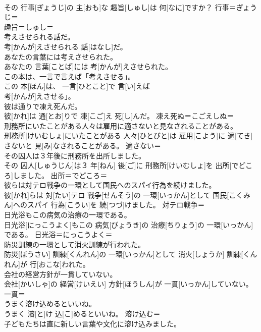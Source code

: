 \documentclass[8pt]{extreport}
\begin{document}
\begin{CJK}{UTF8}{min}
\\	その 行事[ぎょうじ]の 主[おも]な 趣旨[しゅし]は 何[なに]ですか？	行事＝ぎょうじ＝ 
\\	趣旨＝しゅし＝ 
\\	考えさせられる話だ。	
\\	考[かんが]えさせられる 話[はなし]だ。	
\\	あなたの言葉には考えさせられた。	
\\	あなたの 言葉[ことば]には 考[かんが]えさせられた。	
\\	この本は、一言で言えば「考えさせる」。	
\\	この 本[ほん]は、 一言[ひとこと]で 言[い]えば
\\	考[かんが]えさせる」。	
\\	彼は通りで凍え死んだ。	
\\	彼[かれ]は 通[とお]りで 凍[こご]え 死[し]んだ。	凍え死ぬ＝こごえしぬ＝ 
\\	刑務所にいたことがある人々は雇用に適さないと見なされることがある。	
\\	刑務所[けいむしょ]にいたことがある 人々[ひとびと]は 雇用[こよう]に 適[てき]さないと 見[み]なされることがある。	適さない＝ 
\\	その囚人は３年後に刑務所を出所しました。	
\\	その 囚人[しゅうじん]は３ 年[ねん] 後[ご]に 刑務所[けいむしょ]を 出所[でどころ]しました。	出所＝でどころ＝ 
\\	彼らは対テロ戦争の一環として国民へのスパイ行為を続けました。	
\\	彼[かれ]らは 対[たい]テロ 戦争[せんそう]の 一環[いっかん]として 国民[こくみん]へのスパイ 行為[こうい]を 続[つづ]けました。	対テロ戦争＝ 
\\	日光浴もこの病気の治療の一環である。	
\\	日光浴[にっこうよく]もこの 病気[びょうき]の 治療[ちりょう]の 一環[いっかん]である。	日光浴＝にっこうよく＝ 
\\	防災訓練の一環として消火訓練が行われた。	
\\	防災[ぼうさい] 訓練[くんれん]の 一環[いっかん]として 消火[しょうか] 訓練[くんれん]が 行[おこな]われた。	
\\	会社の経営方針が一貫していない。	
\\	会社[かいしゃ]の 経営[けいえい] 方針[ほうしん]が 一貫[いっかん]していない。	一貫＝ 
\\	うまく溶け込めるといいね。	
\\	うまく 溶[と]け 込[こ]めるといいね。	溶け込む＝ 
\\	子どもたちは直に新しい言葉や文化に溶け込みました。	

\end{CJK}
\end{document}
